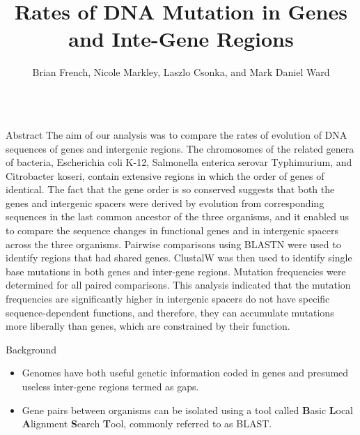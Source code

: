 \documentclass[final]{beamer}
\title[Fancy Posters]{Rates of DNA Mutation in Genes and Inte-Gene Regions}
\author{Brian French, Nicole Markley, Laszlo Csonka, and Mark Daniel Ward}
\institute{Department of Biology, Purdue University, West Lafayette, IN}
\begin{document}
	\begin{frame}{}
	\begin{columns}[t]
		
		
		\begin{column}{.32 \linewidth}
			\begin{block}{\large Abstract}
				The aim of our analysis was to compare the rates of evolution of DNA sequences of genes and intergenic regions. The chromosomes of the related genera of bacteria, Escherichia coli K-12, Salmonella enterica serovar Typhimurium, and Citrobacter koseri, contain extensive regions in which the order of genes of identical. The fact that the gene order is so conserved suggests that both the genes and intergenic spacers were derived by evolution from corresponding sequences in the last common ancestor of the three organisms, and it enabled us to compare the sequence changes in functional genes and in intergenic spacers across the three organisms.
				\newline
				\newline
				Pairwise comparisons using BLASTN were used to identify regions that had shared genes. ClustalW was then used to identify single base mutations in both genes and inter-gene regions. Mutation frequencies were determined for all paired comparisons. This analysis indicated that the mutation frequencies are significantly higher in intergenic spacers do not have specific sequence-dependent functions, and therefore, they can accumulate mutations more liberally than genes, which are constrained by their function.
			\end{block}
			
			\begin{block}{\large Background}
				\begin{itemize}
					\item Genomes have both useful genetic information coded in genes and presumed useless inter-gene regions termed as gaps.
					\item Gene pairs between organisms can be isolated using a tool called \textbf{B}asic \textbf{L}ocal \textbf{A}lignment \textbf{S}earch \textbf{T}ool, commonly referred to as BLAST. 
					

\end{itemize}
\end{block}
\end{column}
\end{columns}
\end{frame}
\end{document}
